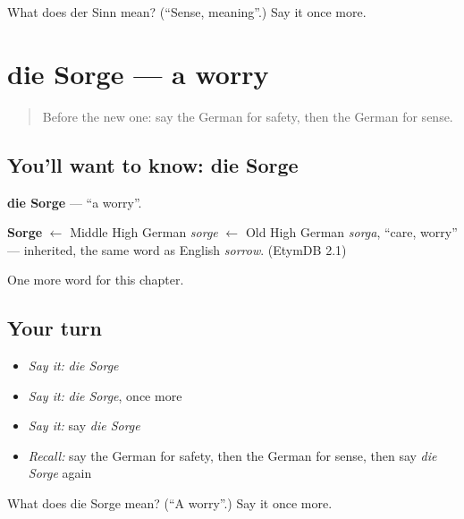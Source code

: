 \begin{tcolorbox}[breakable,colback=teal!4,colframe=teal!35!black,title={Before you move on}]
What does der Sinn mean? (\textquotedblleft{}Sense, meaning\textquotedblright{}.) Say it once more.
\end{tcolorbox}
\section[die Sorge]{die Sorge — a worry}

\label{lesson:GE-C238-sorge}



\begin{quote}
Before the new one: say the German for safety, then the German for sense.
\end{quote}

\subsection*{You'll want to know: die Sorge}
\textbf{die Sorge} — \textquotedblleft{}a worry\textquotedblright{}.

\begin{cousinweb}
\textbf{Sorge} $\leftarrow$ Middle High German \emph{sorge} $\leftarrow$ Old High German \emph{sorga}, \textquotedblleft{}care, worry\textquotedblright{} — inherited, the same word as English \emph{sorrow}. (EtymDB 2.1)
\end{cousinweb}

\begin{grammarlens}[title={What you've built}]
One more word for this chapter.
\end{grammarlens}

\subsection*{Your turn}
\begin{itemize}
\raggedright
  \item \emph{Say it:} \emph{die Sorge}
  \item \emph{Say it:} \emph{die Sorge}, once more
  \item \emph{Say it:} say \emph{die Sorge}
  \item \emph{Recall:} say the German for safety, then the German for sense, then say \emph{die Sorge} again
\end{itemize}

\begin{tcolorbox}[breakable,colback=teal!4,colframe=teal!35!black,title={Before you move on}]
What does die Sorge mean? (\textquotedblleft{}A worry\textquotedblright{}.) Say it once more.
\end{tcolorbox}
